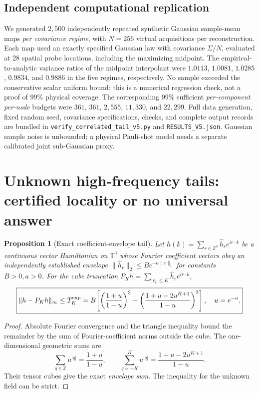 \documentclass[aps,prd,onecolumn,notitlepage,11pt,superscriptaddress,longbibliography]{revtex4-2}
\newtheorem{proposition}{Proposition}
\begin{document}
\subsection{Independent computational replication}
We generated $2{,}500$ independently repeated synthetic Gaussian sample-mean maps \emph{per covariance regime}, with $N=256$ virtual acquisitions per reconstruction. Each map used an exactly specified Gaussian law with covariance $\Sigma/N$, evaluated at 28 spatial probe locations, including the maximizing midpoint. The empirical-to-analytic variance ratios of the midpoint interpolant were $1.0113$, $1.0081$, $1.0285$, $0.9834$, and $0.9886$ in the five regimes, respectively. No sample exceeded the conservative scalar uniform bound; this is a numerical regression check, not a proof of $99\%$ physical coverage. The corresponding 99\% sufficient \emph{per-component per-node} budgets were $361$, $361$, $2{,}555$, $11{,}330$, and $22{,}299$. Full data generation, fixed random seed, covariance specifications, checks, and complete output records are bundled in \texttt{verify\_correlated\_tail\_v5.py} and \texttt{RESULTS\_V5.json}. Gaussian sample noise is unbounded; a physical Pauli-shot model needs a separate calibrated joint sub-Gaussian proxy.

\section{Unknown high-frequency tails: certified locality or no universal answer}
\label{sec:v5-tail}

\begin{proposition}[Exact coefficient-envelope tail]\label{prop:v5-tail}
Let $h(k)=\sum_{r\in\mathbb Z^3}\widehat h_re^{ir\cdot k}$ be a continuous vector Hamiltonian on $\mathbb T^3$ whose Fourier coefficient vectors obey an \emph{independently established} envelope
$\|\widehat h_r\|_2\le B e^{-a\|r\|_1}$ for constants $B>0,a>0$.
For the cube truncation $P_K h=\sum_{|r_i|\le K}\widehat h_r e^{ir\cdot k}$,
\begin{equation}\label{eq:v5-tail}
\boxed{\|h-P_Kh\|_\infty\le
T_K^{\rm exp}=B\!\left[
\left(\frac{1+u}{1-u}\right)^3
-\left(\frac{1+u-2u^{K+1}}{1-u}\right)^3\right],\quad u=e^{-a}.}
\end{equation}
\end{proposition}
\begin{proof}
Absolute Fourier convergence and the triangle inequality bound the
remainder by the sum of Fourier-coefficient norms outside the cube.
The one-dimensional geometric sums are
\[
\sum_{q\in\mathbb Z}u^{|q|}=\frac{1+u}{1-u},\qquad
\sum_{q=-K}^{K}u^{|q|}=\frac{1+u-2u^{K+1}}{1-u}.
\]
Their tensor cubes give the exact \emph{envelope sum}. The inequality
for the unknown field can be strict.
\end{proof}
\end{document}
